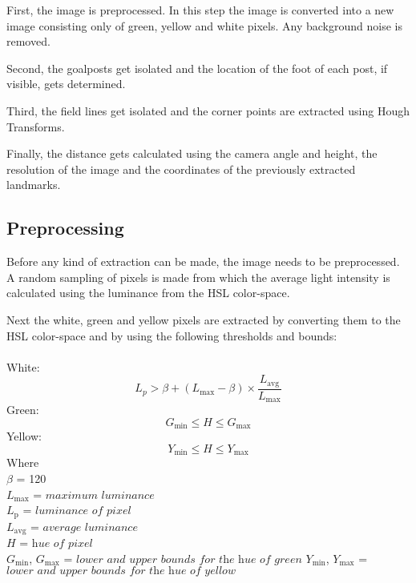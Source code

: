 \documentclass{ba-kecs}
\numberwithin{figure}{section}
\numberwithin{equation}{section}
\begin{document}
First, the image is preprocessed. In this step the image is converted into a new image consisting only of green, yellow and white pixels. Any background noise is removed.

Second, the goalposts get isolated and the location of the foot of each post, if visible, gets determined.

Third, the field lines get isolated and the corner points are extracted using Hough Transforms.

Finally, the distance gets calculated using the camera angle and height, the resolution of the image and the coordinates of the previously extracted landmarks.

\subsection{Preprocessing}
Before any kind of extraction can be made, the image needs to be preprocessed. A random sampling of pixels is made from which the average light intensity is calculated using the luminance from the HSL color-space.

Next the white, green and yellow pixels are extracted by converting them to the HSL color-space and by using the following thresholds and bounds:\\ \\
White:
	\begin{equation}
	L_{p} > \beta + (L_{\mathrm{max}}-\beta) \times \frac{L_{\mathrm{avg}}}{L_{\mathrm{max}}} \label{whiteImgProc}
	\end{equation}
Green:
	\begin{equation}
	G_{\mathrm{min}} \leq H \leq G_{\mathrm{max}} \label{greenImgProc}
	\end{equation}
Yellow:
	\begin{equation}
	Y_{\mathrm{min}} \leq H \leq Y_{\mathrm{max}} \label{yellowImgProc}
	\end{equation}
Where \\
	$\beta$ = 120 \\
	$L_{\mathrm{max}}$ = $\textit{maximum luminance}$ \\
	$L_{\mathrm{p}}$ = $\textit{luminance of pixel}$ \\
	$L_{\mathrm{avg}}$ = $\textit{average luminance}$ \\
	$\textit{H}$ = $\textit{hue of pixel}$ \\
	$G_{\mathrm{min}}$, $G_{\mathrm{max}}$ = $\textit{lower and upper bounds for 		the hue of green}$
	$Y_{\mathrm{min}}$, $Y_{\mathrm{max}}$ = $\textit{lower and upper bounds for 		the hue of yellow}$
	
\end{document}
